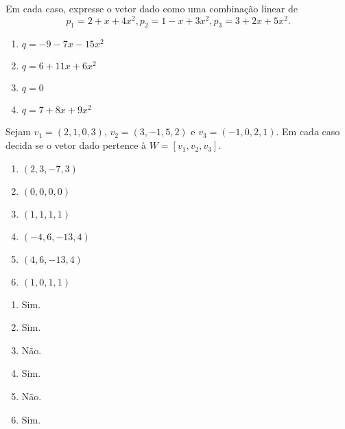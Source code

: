 \documentclass[12pt]{exam}
\begin{document}
\begin{exercicio}
    Em cada caso, expresse o vetor dado como uma combinação linear de
    \[
        p_1 = 2 + x + 4x^2,
        p_2 = 1 - x + 3x^2,
        p_3 = 3 + 2x + 5x^2.
    \]
    \begin{multicols}{2}
        \begin{enumerate}[label={\alph*})]
            \item $q = -9 -7x - 15x^2$

            \item $q = 6 + 11x + 6x^2$

            \item $q = 0$

            \item $q = 7 + 8x + 9x^2$
        \end{enumerate}
    \end{multicols}
\end{exercicio}

\begin{exercicio}
    Sejam $v_1 = (2, 1, 0, 3)$, $v_2 = (3, -1, 5, 2)$ e $v_3 = (-1, 0, 2, 1)$. Em cada caso decida se o vetor dado pertence à $W = [v_1, v_2, v_3]$.
    \begin{multicols}{2}
        \begin{enumerate}[label={\alph*})]
            \item $(2, 3, -7, 3)$

            \item $(0, 0, 0, 0)$

            \item $(1, 1, 1, 1)$

            \item $(-4, 6, -13, 4)$

            \item $(4, 6, -13, 4)$

            \item $(1, 0, 1, 1)$
        \end{enumerate}
    \end{multicols}
    \begin{solucao}
      \begin{multicols}{2}
        \begin{enumerate}[label={\alph*})]
          \item Sim.

          \item Sim.

          \item Não.

          \item Sim.

          \item Não.

          \item Sim.
        \end{enumerate}
      \end{multicols}
    \end{solucao}
\end{exercicio}
\end{document}
